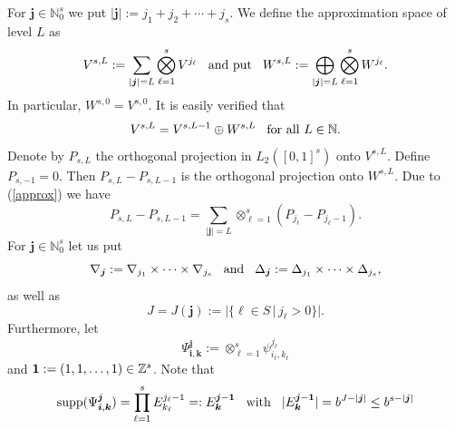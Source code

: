 \documentclass[12pt]{article}
\DeclareMathOperator{\supp}{supp}
\newcommand{\bsk}{\boldsymbol{k}}
\newcommand{\bsi}{\boldsymbol{i}}
\newcommand{\bsj}{\boldsymbol{j}}
\newcommand{\NN}{\mathbb{N}}
\newcommand{\ZZ}{\mathbb{Z}}
\newcommand{\N}{\mathbb{N}}
\begin{document}
For $\bsj\in \NN_0^s$ we put $|\bsj| := j_1+j_2+\cdots +j_s$.
We define the approximation space of level $L$ as
\begin{equation}
\label{approx}
V^{s,L} := \sum_{|\bsj|=L} \bigotimes^s_{\ell =1} V^{j_\ell}
\hspace{2ex}\text{and put}\hspace{2ex}
W^{s,L} := \bigoplus_{|\bsj|=L}\bigotimes^s_{\ell=1} W^{j_\ell}.
\end{equation}
In particular, $W^{s,0} = V^{s,0}$.
It is easily verified that
\begin{equation*}
V^{s,L} = V^{s,L-1}\oplus W^{s,L}
\hspace{2ex}\text{for all $L\in\NN$.}
\end{equation*}
Denote by $P_{s,L}$ the orthogonal projection in $L_2([0,1]^s)$ onto
$V^{s,L}$. Define $P_{s,-1} =0$.
Then $P_{s,L}-P_{s,L-1}$ is the orthogonal projection
onto $W^{s,L}$. Due to (\ref{approx}) we have
\begin{equation}
\label{tensorproj}
P_{s,L}-P_{s,L-1} = \sum_{|\bsj|=L} \otimes^s_{\ell=1}
(P_{j_\ell}-P_{j_\ell-1}).
\end{equation}
For $\bsj\in\NN_0^s$ let us put
\begin{equation}\label{neu-ws-1}
\nabla_{\bsj} := \nabla_{j_1}\times\cdots\times \nabla_{j_s}
\hspace{2ex}\text{and}\hspace{2ex}
\Delta_{\bsj} := \Delta_{j_1}\times\cdots\times \Delta_{j_s},
\end{equation}
as well as
\begin{equation*}
J=J(\bsj) := | \{ \ell \in S \,|\, j_{\ell} > 0 \}|.
\end{equation*}
Furthermore, let
\begin{equation*}
\Psi^{\bsj}_{\bsi,\bsk} := \otimes^s_{\ell=1}
\psi^{j_\ell}_{i_\ell, k_\ell}
\end{equation*}
and ${\bf 1} := (1,1,\ldots,1) \in \ZZ^s$. 
Note that 
\begin{equation*}
\supp( \Psi^{\bsj}_{\bsi,\bsk} ) = \prod_{\ell = 1}^s E^{j_\ell -1}_{k_\ell} =: E^{\bsj- {\bf 1}}_{\bsk} 
\hspace{2ex}\text{with}\hspace{2ex} |E^{\bsj- {\bf 1}}_{\bsk}| 
= b^{J-|\bsj|} \le b^{s-|\bsj|}
\end{equation*}
\end{document}
